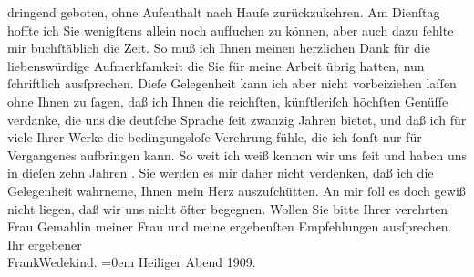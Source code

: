 \begin{ledgroupsized}[t]{13cm}
               dringend geboten, ohne Aufenthalt nach Hauſe zurückzukehren. Am Dienſtag hoffte ich Sie
               wenigſtens allein noch aufſuchen zu können, aber auch dazu fehlte mir buchſtäblich
               die Zeit. So muß ich Ihnen meinen herzlichen Dank für die liebenswürdige
               Aufmerkſamkeit {\pb}die Sie für meine Arbeit
               übrig hatten, nun ſchriftlich ausſprechen. Dieſe Gelegenheit kann ich aber nicht
               vorbeiziehen laſſen ohne Ihnen zu ſagen, daß ich Ihnen die reichſten, künſtleriſch
               höchſten Genüſſe verdanke, die uns die deutſche Sprache ſeit zwanzig Jahren bietet,
               und daß ich für viele Ihrer Werke die bedingungsloſe Verehrung fühle, die ich ſonſt
               nur für Vergangenes aufbringen kann. So weit ich weiß kennen wir uns ſeit \label{K_L01909_1v}\label{K_L01909_1h} und haben
               uns in dieſen zehn Jahren {\pb}\label{K_L01909_2v}\label{K_L01909_2h}. Sie werden es mir daher nicht
               verdenken, daß ich die Gelegenheit wahrneme, Ihnen mein Herz auszuſchütten. An mir
               ſoll es doch gewiß nicht liegen, daß wir uns nicht öfter begegnen.\pend
           \pstart
           Wollen Sie bitte Ihrer verehrten Frau
                  Gemahlin meiner Frau und
               meine ergebenſten Empfehlungen ausſprechen.\pend
           \pstart
           Ihr ergebener{\\[\baselineskip]}\spacefill\mbox{FrankWedekind.}\pend
           \leftskip=0em{}\pstart
           Heiliger Abend 1909.\pend
           \endnumbering{}\end{ledgroupsized}  \newcommand{\dateiname}{L01909}\newcommand{\titel}{Frank Wedekind an Arthur Schnitzler, 24. 12. 1909}\newcommand{\editorInnen}{Martin Anton Müller und Gerd-Hermann Susen}
      